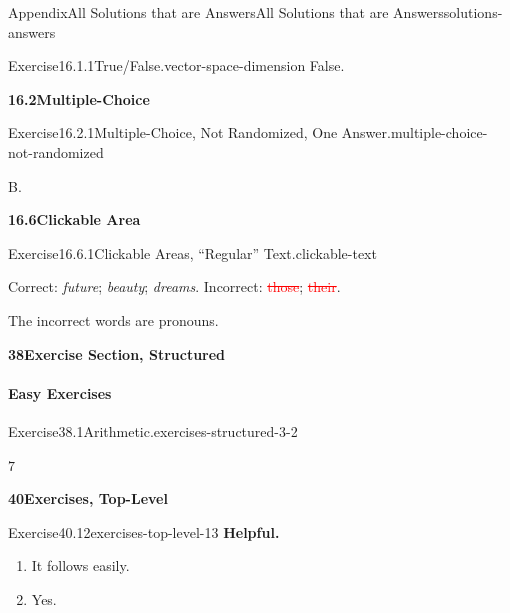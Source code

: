 \documentclass[twoside,10pt,]{article}
\newcommand{\blocktitlefont}{\relax}
\newcommand{\deletethick}{.25ex}
\newcommand{\deleted}[1]{\renewcommand{\ULthickness}{\deletethick}\textcolor{red}{\sout{#1}}}
\numberwithin{equation}{section}
\begin{document}
\begin{solutions-section}{Appendix}{All Solutions that are Answers}{}{All Solutions that are Answers}{}{}{solutions-answers}
\begin{divisionsolution}{Exercise}{16.1.1}{True\slash{}False.}{vector-space-dimension}
\noindent\hypertarget{vector-space-dimension-5-back}{}False.%
\end{divisionsolution}%
\par\medskip
\noindent\textbf{\large{}16.2\space\textperiodcentered\space{}Multiple-Choice}
\begin{divisionsolution}{Exercise}{16.2.1}{Multiple-Choice, Not Randomized, One Answer.}{multiple-choice-not-randomized}%
\par\smallskip%
\noindent\hypertarget{multiple-choice-not-randomized-6-back}{}B.%
\end{divisionsolution}%
\par\medskip
\noindent\textbf{\large{}16.6\space\textperiodcentered\space{}Clickable Area}
\begin{divisionsolution}{Exercise}{16.6.1}{Clickable Areas, ``Regular'' Text.}{clickable-text}%
\par\smallskip%
\noindent\hypertarget{clickable-text-3-back}{}Correct: \emph{future}; \emph{beauty}; \emph{dreams}. Incorrect: \deleted{those}; \deleted{their}.%
\par
The incorrect words are pronouns.%
\end{divisionsolution}%
\par\medskip
\noindent\textbf{\large{}38\space\textperiodcentered\space{}Exercise Section, Structured}
\paragraph[{Easy Exercises}]{Easy Exercises}
\begin{divisionsolution}{Exercise}{38.1}{Arithmetic.}{exercises-structured-3-2}%
\par\smallskip%
\noindent\hypertarget{exercises-structured-3-2-3-back}{}\(7\)%
\end{divisionsolution}%
\par\medskip\noindent
\par\medskip
\noindent\textbf{\large{}40\space\textperiodcentered\space{}Exercises, Top-Level}
\begin{divisionsolution}{Exercise}{40.12}{}{exercises-top-level-13}%
\noindent\textbf{\blocktitlefont  Helpful.}\hypertarget{exercise-complicated-first-answer-back}{}\quad{}%
\begin{enumerate}[label={(\alph*)}]
\item{}It follows easily.%
\item{}Yes.%
\end{enumerate}
%
\end{divisionsolution}%
\end{solutions-section}
\end{document}
